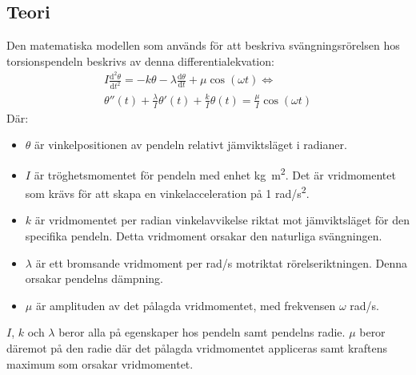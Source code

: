 \documentclass[12pt, a4paper]{article}
\begin{document}
\subsection{Teori}
Den matematiska modellen som används för att beskriva svängningsrörelsen hos torsionspendeln beskrivs av denna differentialekvation:
\begin{equation}
    \begin{split}
        I\frac{\mathrm{d}^2\theta}{\mathrm{d}t^2}=-k\theta-\lambda\frac{\mathrm{d}\theta}{\mathrm{d}t}+\mu\cos(\omega t)\Leftrightarrow\\
        \theta''(t)+\frac{\lambda}{I}\theta'(t)+\frac{k}{I}\theta(t)=\frac{\mu}{I}\cos(\omega t)
    \end{split}
\end{equation}
Där: 
\begin{itemize}
    \item $\theta$ är vinkelpositionen av pendeln relativt jämviktsläget i radianer.
    \item $I$ är tröghetsmomentet för pendeln med enhet \si{kg.m^2}. Det är vridmomentet som krävs för att skapa en vinkelacceleration på 1 \si{rad/s^2}.
    \item $k$ är vridmomentet per radian vinkelavvikelse riktat mot jämviktsläget för den specifika pendeln. Detta vridmoment orsakar den naturliga svängningen.
    \item $\lambda$ är ett bromsande vridmoment per \si{rad/s} motriktat rörelseriktningen. Denna orsakar pendelns dämpning.
    \item $\mu$ är amplituden av det pålagda vridmomentet, med frekvensen $\omega$ \si{rad/s}.
\end{itemize}
$I$, $k$ och $\lambda$ beror alla på egenskaper hos pendeln samt pendelns radie. $\mu$ beror däremot på den radie där det pålagda vridmomentet appliceras samt kraftens maximum som orsakar vridmomentet.
\end{document}
